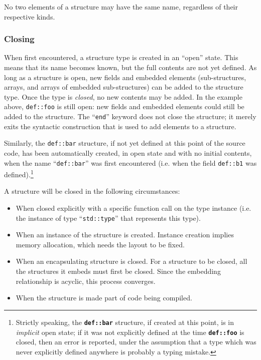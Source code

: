 No two elements of a structure may have the same name, regardless of
their respective kinds.

\subsubsection{Closing}

When first encountered, a structure type is created in an ``open''
state. This means that its name becomes known, but the full contents are
not yet defined. As long as a structure is open, new fields and embedded
elements (sub-structures, arrays, and arrays of embedded sub-structures)
can be added to the structure type. Once the type is \emph{closed}, no
new contents may be added. In the example above, \verb|def::foo| is
still open: new fields and embedded elements could still be added to the
structure. The ``\verb|end|'' keyword does not close the structure; it
merely exits the syntactic construction that is used to add elements to
a structure.

Similarly, the \verb|def::bar| structure, if not yet defined at this
point of the source code, has been automatically created, in open state
and with no initial contents, when the name ``\verb|def::bar|'' was
first encountered (i.e. when the field \verb|def::b1| was
defined).\footnote{Strictly speaking, the \texttt{\textbf{def::bar}}
structure, if created at this point, is in \emph{implicit} open state;
if it was not explicitly defined at the time \texttt{\textbf{def::foo}}
is closed, then an error is reported, under the assumption that a type
which was never explicitly defined anywhere is probably a typing
mistake.}

A structure will be closed in the following circumstances:
\begin{itemize}

    \item When closed explicitly with a specific function call on the
    type instance (i.e. the instance of type ``\verb|std::type|'' that
    represents this type).

    \item When an instance of the structure is created. Instance creation
    implies memory allocation, which needs the layout to be fixed.

    \item When an encapsulating structure is closed. For a structure to
    be closed, all the structures it embeds must first be closed. Since
    the embedding relationship is acyclic, this process converges.

    \item When the structure is made part of code being compiled.

\end{itemize}

